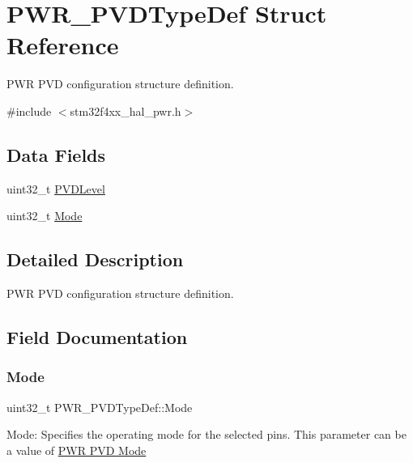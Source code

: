 \hypertarget{struct_p_w_r___p_v_d_type_def}{}\section{P\+W\+R\+\_\+\+P\+V\+D\+Type\+Def Struct Reference}
\label{struct_p_w_r___p_v_d_type_def}


P\+WR P\+VD configuration structure definition.  




{\ttfamily \#include $<$stm32f4xx\+\_\+hal\+\_\+pwr.\+h$>$}

\subsection*{Data Fields}
\begin{DoxyCompactItemize}
\item 
uint32\+\_\+t \hyperlink{struct_p_w_r___p_v_d_type_def_a540471bc6ac947fd8bc2c87f61d9faab}{P\+V\+D\+Level}
\item 
uint32\+\_\+t \hyperlink{struct_p_w_r___p_v_d_type_def_af692d691f0cb5871b319fd371fab34d8}{Mode}
\end{DoxyCompactItemize}


\subsection{Detailed Description}
P\+WR P\+VD configuration structure definition. 

\subsection{Field Documentation}
\mbox{\label{struct_p_w_r___p_v_d_type_def_af692d691f0cb5871b319fd371fab34d8}} 
\subsubsection{\texorpdfstring{Mode}{Mode}}
{\footnotesize\ttfamily uint32\+\_\+t P\+W\+R\+\_\+\+P\+V\+D\+Type\+Def\+::\+Mode}

Mode\+: Specifies the operating mode for the selected pins. This parameter can be a value of \hyperlink{group___p_w_r___p_v_d___mode}{P\+WR P\+VD Mode} \mbox{\label{struct_p_w_r___p_v_d_type_def_a540471bc6ac947fd8bc2c87f61d9faab}} 
